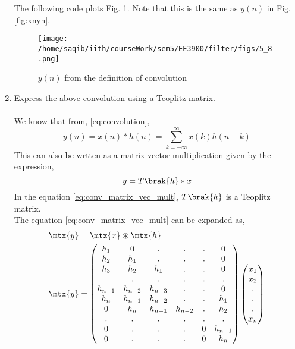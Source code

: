 \documentclass[journal,12pt,twocolumn]{IEEEtran}
\renewcommand\thesection{\arabic{section}}
\begin{document}
\begin{enumerate}[label=\thesection.\arabic*]
\solution The following code plots Fig. \ref{fig:ynconv}. Note that this is the same as 
$y(n)$ in  Fig. 
\ref{fig:xnyn}. 
%

\begin{figure}[!ht]
\centering
\texttt{[image: /home/saqib/iith/courseWork/sem5/EE3900/filter/figs/5\_8.png]}
\caption{$y(n)$ from the definition of convolution}
\label{fig:ynconv}
\end{figure}
\item Express the above convolution using a Teoplitz matrix.
\\\solution\\

We know that from, \eqref{eq:convolution},
\begin{equation}
	y(n) = x(n)*h(n) = \sum_{k=-\infty}^{\infty}x(k)h(n-k)
\end{equation}
This can also be wrtten as a matrix-vector multiplication given by the expression,
\begin{equation}
	\label{eq:conv_matrix_vec_mult}
	y = T\brak{h}*x
\end{equation}
In the equation \eqref{eq:conv_matrix_vec_mult}, $T\brak{h}$ is a Teoplitz matrix.
\\ The equation \eqref{eq:conv_matrix_vec_mult} can be expanded as,
\begin{align}
	\mtx{y} &= \mtx{x} \circledast \mtx{h}\\
	\mtx{y} &= 
	\begin{pmatrix}
		h_1 & 0 & . & . & . & 0 \\
		h_2 & h_1 & . & . & . & 0 \\
		h_3 & h_2 & h_1 & . & . & 0 \\
		. & . & . & . & . & . \\
		h_{n-1} & h_{n-2} & h_{n-3} & . & . & 0\\
		h_{n} & h_{n-1} & h_{n-2} & . & . & h_1\\
		0 & h_{n} & h_{n-1} & h_{n-2} & . & h_2\\
		. & . & . & . & . & . \\
		0 & . & . & . & 0 & h_{n-1} \\
		0 & . & . & . & 0 & h_n \\
	\end{pmatrix}
	\begin{pmatrix}
		x_1 \\ x_2 \\ .\\.\\. \\ x_n

\end{pmatrix}
\end{align}
\end{enumerate}
\end{document}
